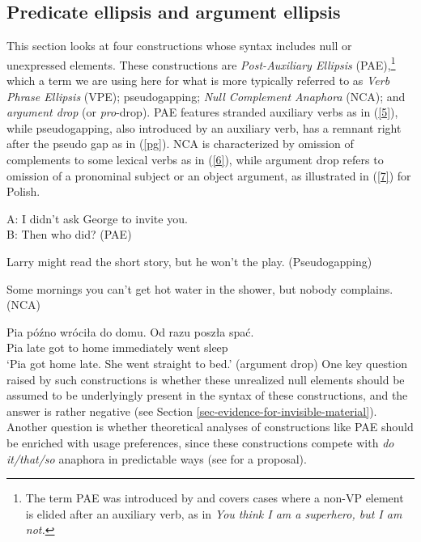{\subsection{Predicate ellipsis and argument ellipsis}
This section looks at four constructions whose syntax includes null or unexpressed elements. These constructions are \emph{Post-Auxiliary Ellipsis} (PAE),\footnote{The term PAE was introduced by \citet{Sag1976} and covers cases where a non-VP element is
elided after an auxiliary verb, as in \emph{You think
I am a superhero, but I am not.}} which a term we are using here for what is more typically referred to as \emph{Verb Phrase Ellipsis} (VPE); pseudogapping; \emph{Null Complement Anaphora} (NCA); and \emph{argument drop} (or \emph{pro}-drop). PAE features stranded auxiliary verbs as in (\ref{5}), while pseudogapping, also introduced by an auxiliary verb,
has a remnant right after the pseudo gap as in (\ref{pg}). 
%
%
%
%
 NCA is characterized by omission of complements to some lexical verbs as in (\ref{6}), while argument drop refers to omission of a pronominal subject or an object argument, as illustrated in (\ref{7}) for Polish.

\ea A: I didn't ask George to invite you.\\B: Then who did? (PAE) \label{5}\z

\ea 
Larry might read the short story, but he won't the play.
(Pseudogapping) \label{pg}\z

\ea Some mornings you can't get hot water in the shower, but nobody complains. (NCA) \label{6} \z

\ea
\gll Pia p\'{o}\'{z}no wr\'{o}ci\l a do domu. {Od razu} posz\l a spa\'{c}.\\
Pia late got to home immediately went sleep\\
\glt `Pia got home late. She went straight to bed.'
(argument drop) \label{7}
\z
%
One key question raised by such constructions
 is whether these unrealized null elements should be assumed to be underlyingly present in the syntax of these constructions, and the answer is rather negative (see Section \ref{sec-evidence-for-invisible-material}). Another question is whether theoretical analyses of constructions like PAE should be enriched with usage preferences, since these constructions compete with \textit{do it/that/so} anaphora in predictable ways (see \citealt{Miller2013a} for a proposal).


}
